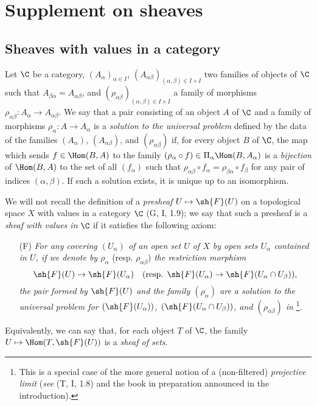 \section{Supplement on sheaves}
\label{section:supplement-on-sheaves}

\subsection{Sheaves with values in a category}
\label{subsection:sheaves-with-values-in-cat}

\begin{env}[3.1.1]
\label{0.3.1.1}
Let $\C$ be a category, $(A_\alpha)_{\alpha\in I}$,
$(A_{\alpha\beta})_{(\alpha,\beta)\in I\times I}$ two families of objects of
$\C$ such that $A_{\beta\alpha}=A_{\alpha\beta}$, and
$(\rho_{\alpha\beta})_{(\alpha,\beta)\in I\times I}$ a family of morphisms
$\rho_{\alpha\beta}:A_\alpha\to A_{\alpha\beta}$. We say that a pair consisting
of an object $A$ of $\C$ and a family of morphisms $\rho_\alpha:A\to A_\alpha$
is a \emph{solution to the universal problem} defined by the data of the
families $(A_\alpha)$, $(A_{\alpha\beta})$, and $(\rho_{\alpha\beta})$ if, for
every object $B$ of $\C$, the map which sends $f\in\Hom(B,A)$ to the family
$(\rho_\alpha\circ f)\in\Pi_\alpha\Hom(B,A_\alpha)$ is a \emph{bijection} of
$\Hom(B,A)$ to the set of all $(f_\alpha)$ such that
$\rho_{\alpha\beta}\circ f_\alpha=\rho_{\beta\alpha}\circ f_\beta$ for any pair
of indices $(\alpha,\beta)$. If such a solution exists, it is unique up to an
isomorphism.
\end{env}

\begin{env}[3.1.2]
\label{0.3.1.2}
We will not recall the definition of a \emph{presheaf} $U\mapsto\sh{F}(U)$ on a
topological space $X$ with values in a category $\C$ (G, I, 1.9); we say that
such a presheaf is a \emph{sheaf with values in} $\C$ if it satisfies the
following axiom:
\begin{enumerate}
  \item[(F)] \emph{For any covering $(U_\alpha)$ of an open set $U$ of $X$ by open sets $U_\alpha$ contained in $U$, if we denote by $\rho_\alpha$} (resp. $\rho_{\alpha\beta}$) \emph{the restriction morphism}
    \[
      \sh{F}(U)\to\sh{F}(U_\alpha)
      \quad(\text{resp. }\sh{F}(U_\alpha)\to\sh{F}(U_\alpha\cap U_\beta)),
    \]
    \emph{the pair formed by $\sh{F}(U)$ and the family $(\rho_\alpha)$ are a
    solution to the universal problem for $(\sh{F}(U_\alpha))$,
    $(\sh{F}(U_\alpha\cap U_\beta))$, and $(\rho_{\alpha\beta})$ in
    }\footnote{This is a special case of the more general
    notion of a (non-filtered) \emph{projective limit} (\emph{see} (T, I, 1.8)
    and the book in preparation announced in the introduction).}.\\
\end{enumerate}

Equivalently, we can say that, for each object $T$ of $\C$, the family
$U\mapsto\Hom(T,\sh{F}(U))$ is a \emph{sheaf of sets}.
\end{env}

